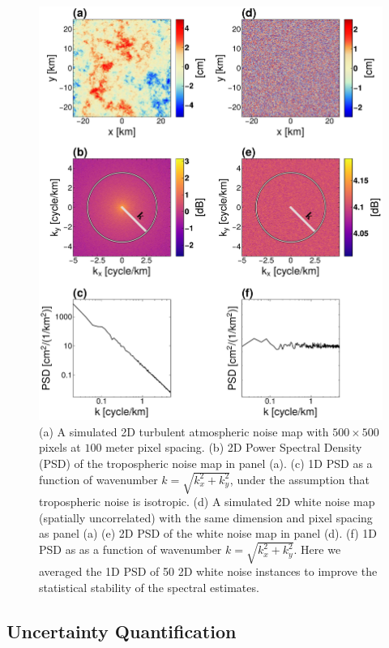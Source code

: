 \begin{figure}
	\centering 
	\includegraphics[width=0.90\linewidth]{figures/chapter6-blobs/figure3_psd_radial.pdf}
	\caption[Calculation of 1D PSDs for tropospheric noise]{
		(a) A simulated 2D turbulent atmospheric noise map with $ 500 \times 500 $ pixels at $100$ meter pixel spacing.
		(b) 2D Power Spectral Density (PSD) of the tropospheric noise map in panel (a).
		(c) 1D PSD as a function of wavenumber $k = \sqrt{k_x^2 + k_y^2}$, under the assumption that tropospheric noise is isotropic.
		(d) A simulated 2D white noise map (spatially uncorrelated) with the same dimension and pixel spacing as panel (a)
		(e) 2D PSD of the white noise map in panel (d).
		(f) 1D PSD as as a function of wavenumber $k = \sqrt{k_x^2 + k_y^2}$. Here we averaged the 1D PSD of 50 2D white noise instances to improve the statistical stability of the spectral estimates.
	}
	\label{fig:psd-example}
\end{figure}

\FloatBarrier


\subsection{Uncertainty Quantification}
\label{subsec:methods-3-noise-sim}

